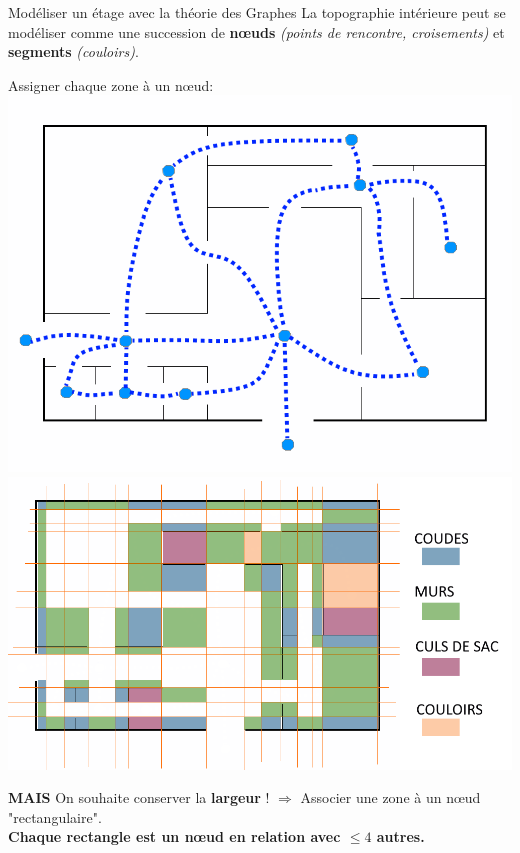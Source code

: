 \documentclass[11pt]{beamer}
\begin{document}
\begin{frame}{Modéliser un étage avec la théorie des Graphes}
La topographie intérieure peut se modéliser comme une succession de \textbf{nœuds} \textit{(points de rencontre, croisements)} et \textbf{segments} \textit{(couloirs)}.\\

\begin{block}{Assigner chaque zone à un nœud:}
\hspace{1cm}
\includegraphics[scale=0.2]{noeuds.png}
\hspace{1cm}
\includegraphics[scale=0.2]{carres.png}
\end{block}

\textbf{MAIS} On souhaite conserver la \textbf{largeur} ! $\Rightarrow$ Associer une zone à un nœud "rectangulaire".\\

\textbf{Chaque rectangle est un nœud en relation avec $\leq 4$ autres.}
\vspace{0.5cm}
\end{frame}
    
\end{document}

